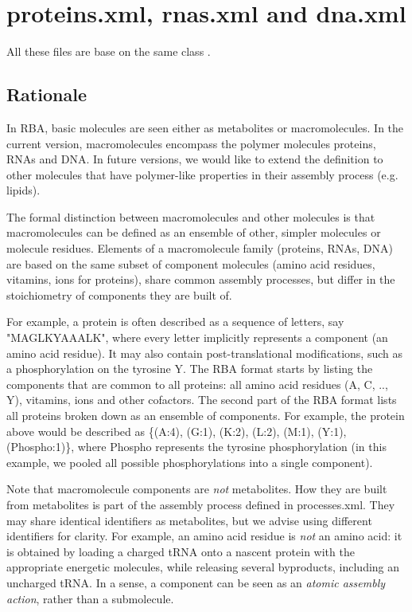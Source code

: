 
\section{proteins.xml, rnas.xml and dna.xml}

All these files are base on the same class \rbamacromolecules.

\subsection{Rationale}

In RBA, basic molecules are seen either as metabolites or macromolecules.
In the current version, macromolecules encompass the polymer molecules
proteins, RNAs and DNA.
In future versions, we would like to extend the definition to other molecules
that have polymer-like properties in their assembly process (e.g. lipids).

The formal distinction between macromolecules and other molecules is that
macromolecules can be defined as an ensemble of other, simpler
molecules or molecule residues.
Elements of a macromolecule family (proteins, RNAs, DNA) are based on the same subset of
component molecules (amino acid residues, vitamins, ions for proteins),
share common assembly processes,
but differ in the stoichiometry of components they are built of.

For example, a protein is often described as a sequence of letters, say
"MAGLKYAAALK",
where every letter implicitly represents a component (an amino acid residue).
It may also contain post-translational modifications,
such as a phosphorylation on the tyrosine Y.
The RBA format starts by listing the components that are common to all proteins:
all amino acid residues (A, C, .., Y), vitamins, ions and other cofactors.
The second part of the RBA format lists all proteins broken down as an ensemble
of components.
For example, the protein above would be described as
\{(A:4), (G:1), (K:2), (L:2), (M:1), (Y:1), (Phospho:1)\},
where Phospho represents the tyrosine phosphorylation
(in this example, we pooled all possible phosphorylations into a single component).

Note that macromolecule components are \emph{not} metabolites.
How they are built from metabolites is part of the assembly process defined in
processes.xml.
They may share identical identifiers as metabolites, but we advise using different
identifiers for clarity.
For example, an amino acid residue is \emph{not} an amino acid:
it is obtained by loading a charged tRNA onto a nascent protein with the appropriate
energetic molecules, while releasing several byproducts, including an uncharged tRNA.
In a sense, a component can be seen as an \emph{atomic assembly action},
rather than a submolecule.

